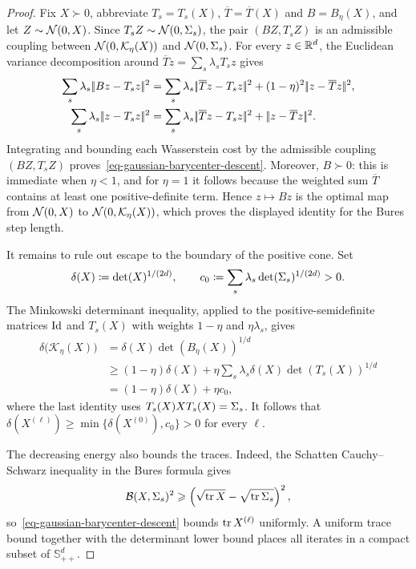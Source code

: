\begin{proof}
	Fix $X\succ0$, abbreviate $T_s=T_s(X)$, $\overline T=\overline T(X)$ and $B=B_\eta(X)$, and let $Z\sim\mathcal{N}(0,X)$. Since $T_sZ\sim\mathcal{N}(0,\Sigma_s)$, the pair $(BZ,T_sZ)$ is an admissible coupling between $\mathcal{N}(0,\mathcal K_\eta(X))$ and $\mathcal{N}(0,\Sigma_s)$. For every $z\in\mathbb{R}^d$, the Euclidean variance decomposition around $\overline Tz=\sum_s\lambda_sT_sz$ gives
	\begin{align*}
		\sum_s\lambda_s\norm{Bz-T_sz}^2
		&=
		\sum_s\lambda_s\norm{\overline Tz-T_sz}^2
		+(1-\eta)^2\norm{z-\overline Tz}^2,
		\\
		\sum_s\lambda_s\norm{z-T_sz}^2
		&=
		\sum_s\lambda_s\norm{\overline Tz-T_sz}^2
		+\norm{z-\overline Tz}^2.
	\end{align*}
	Integrating and bounding each Wasserstein cost by the admissible coupling $(BZ,T_sZ)$ proves~\eqref{eq-gaussian-barycenter-descent}. Moreover, $B\succ0$: this is immediate when $\eta<1$, and for $\eta=1$ it follows because the weighted sum $\overline T$ contains at least one positive-definite term. Hence $z\mapsto Bz$ is the optimal map from $\mathcal{N}(0,X)$ to $\mathcal{N}(0,\mathcal K_\eta(X))$, which proves the displayed identity for the Bures step length.

	It remains to rule out escape to the boundary of the positive cone. Set
	\[
		\delta(X)\coloneqq\det(X)^{1/(2d)},
		\qquad
		c_0\coloneqq\sum_s\lambda_s\det(\Sigma_s)^{1/(2d)}>0.
	\]
	The Minkowski determinant inequality, applied to the positive-semidefinite matrices $\mathrm{Id}$ and $T_s(X)$ with weights $1-\eta$ and $\eta\lambda_s$, gives
	\begin{align*}
		\delta\bigl(\mathcal K_\eta(X)\bigr)
		&=
		\delta(X)\det(B_\eta(X))^{1/d}
		\\
		&\geq
		(1-\eta)\delta(X)
		+
		\eta\sum_s\lambda_s
		\delta(X)\det(T_s(X))^{1/d}
		\\
		&=
		(1-\eta)\delta(X)+\eta c_0,
	\end{align*}
	where the last identity uses $T_s(X)XT_s(X)=\Sigma_s$. It follows that
	$\delta(X^{(\ell)})\geq\min\{\delta(X^{(0)}),c_0\}>0$ for every $\ell$.

	The decreasing energy also bounds the traces. Indeed, the Schatten Cauchy--Schwarz inequality in the Bures formula gives
	\[
		\mathcal{B}(X,\Sigma_s)^2
		\geqslant
		\left( \sqrt{\operatorname{tr} X}-\sqrt{\operatorname{tr}\Sigma_s} \right)^2,
	\]
	so~\eqref{eq-gaussian-barycenter-descent} bounds $\operatorname{tr} X^{(\ell)}$ uniformly. A uniform trace bound together with the determinant lower bound places all iterates in a compact subset of $\mathbb S_{++}^d$.


\end{proof}
